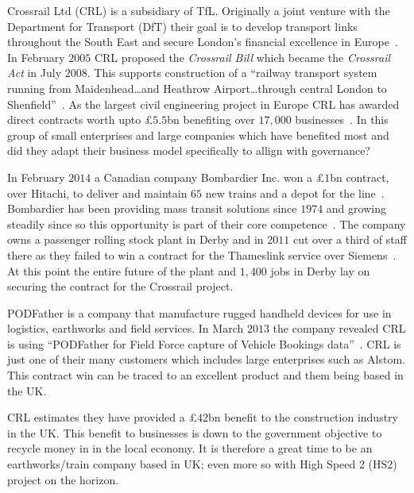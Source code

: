 {}

Crossrail Ltd (CRL) is a subsidiary of TfL.
Originally a joint venture with the Department for Transport (DfT) their goal is to develop transport links throughout the South East and secure London's financial excellence in Europe~\cite{crossrail:about}.
In February $2005$ CRL proposed the \emph{Crossrail Bill} which became the \emph{Crossrail Act} in July $2008$.
This supports construction of a ``railway transport system running from Maidenhead\dots and Heathrow Airport\dots through central London to Shenfield''~\cite{crossrail:act}.
As the largest civil engineering project in Europe CRL has awarded direct contracts worth upto \pounds $5.5$bn benefiting over $17,000$ businesses~\cite{crossrail:suppliers}.
In this group of small enterprises and large companies which have benefited most and did they adapt their business model specifically to allign with governance?  

In February $2014$ a Canadian company Bombardier Inc. won a \pounds $1$bn contract, over Hitachi, to deliver and maintain $65$ new trains and a depot for the line~\cite{bbc:bombardier,tfl:bombardier}.  
Bombardier has been providing mass transit solutions since $1974$ and growing steadily since so this opportunity is part of their core competence~\cite{bombardier:about}.
The company owns a passenger rolling stock plant in Derby and in $2011$ cut over a third of staff there as they failed to win a contract for the Thameslink service over Siemens~\cite{tele}.
At this point the entire future of the plant and $1,400$ jobs in Derby lay on securing the contract for the Crossrail project.

PODFather is a company that manufacture rugged handheld devices for use in logistics, earthworks and field services.
In March $2013$ the company revealed CRL is using ``PODFather for Field Force capture of Vehicle Bookings data''~\cite{podfather:crl}.
CRL is just one of their many customers which includes large enterprises such as Alstom.
This contract win can be traced to an excellent product and them being based in the UK.


CRL estimates they have provided a \pounds $42$bn benefit to the construction industry in the UK.
This benefit to businesses is down to the government objective to recycle money in in the local economy.
It is therefore a great time to be an earthworks/train company based in UK; even more so with High Speed 2 (HS2) project on the horizon.

